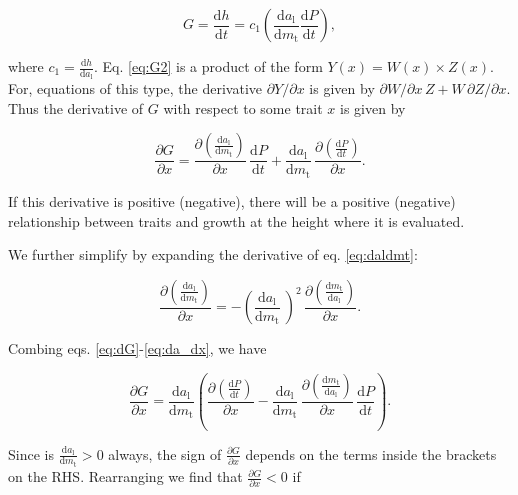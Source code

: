\documentclass[12pt, a4paper]{article}
\begin{document}
\begin{appendices}
\begin{equation} \label{eq:G2}
G = \frac{\textrm{d}h}{\textrm{d}t} = c_1   \left(\frac{\textrm{d}a_\textrm{l}} {\textrm{d}m_\textrm{t}}  \frac{ \textrm{d}P} {\textrm{d}t} \right),
\end{equation}

where $c_1 = \frac{\textrm{d}h}{\textrm{d}a_\textrm{l}}$. Eq.
\ref{eq:G2} is a product of the form $Y(x) = W(x) \times Z(x)$. For,
equations of this type, the derivative $\partial{Y}/\partial{x}$ is
given by $\partial{W}/\partial{x} \, Z + W \, \partial{Z}/\partial{x}$. Thus
the derivative of $G$ with respect to some trait $x$  is given by

\begin{equation} \label{eq:dG}
\frac{\partial G} {\partial x} =
\frac{\partial \left(\frac{\textrm{d}a_\textrm{l}} {\textrm{d}m_\textrm{t}}\right)}{\partial x}
 \, \frac{ \textrm{d}P} {\textrm{d}t}
+ \frac{\textrm{d}a_\textrm{l}} {\textrm{d}m_\textrm{t}}
\, \frac{\partial \left( \frac{ \textrm{d}P} {\textrm{d}t}\right)}{\partial x}.
\end{equation}

If this derivative is positive (negative), there will be a positive (negative) relationship
between traits and growth at the height where it is evaluated.

We further simplify by expanding the derivative of eq. \ref{eq:daldmt}:

\begin{equation} \label{eq:da_dx}
\frac{\partial \left(\frac{\textrm{d}a_\textrm{l}} {\textrm{d}m_\textrm{t}}\right)}
{\partial x} = -\left(\frac{\textrm{d}a_\textrm{l}} {\textrm{d}m_\textrm{t}}\ \right)^2
\, \frac{\partial \left(\frac{\textrm{d}m_\textrm{t}} {\textrm{d}a_\textrm{l}}\right)
}{\partial x}.
\end{equation}

Combing eqs. \ref{eq:dG}-\ref{eq:da_dx}, we have

\begin{equation} \label{eq:dG2}
\frac{\partial G} {\partial x} =
\frac{\textrm{d}a_\textrm{l}} {\textrm{d}m_\textrm{t}}
\left(
\frac{\partial \left( \frac{ \textrm{d}P} {\textrm{d}t}\right)}{\partial x}
- \frac{\textrm{d}a_\textrm{l}} {\textrm{d}m_\textrm{t}}
\,  \frac{\partial \left(\frac{\textrm{d}m_\textrm{t}} {\textrm{d}a_\textrm{l}}\right)
}{\partial x}
 \, \frac{ \textrm{d}P} {\textrm{d}t}
\right).
\end{equation}

Since is $\frac{\textrm{d}a_\textrm{l}} {\textrm{d}m_\textrm{t}}>0$ always, the sign
of $\frac{\partial G} {\partial x}$ depends on the terms inside the brackets on the
RHS. Rearranging we find that $\frac
{\partial G} {\partial x} < 0$ if


\end{appendices}
\end{document}
